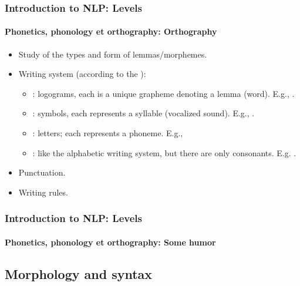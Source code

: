 \documentclass[xcolor=table]{beamer}
\begin{document}
\begin{frame}
\frametitle{Introduction to NLP: Levels}
\framesubtitle{Phonetics, phonology et orthography: Orthography}

\begin{itemize}
	\item Study of the types and form of lemmas/morphemes.
	\item Writing system (according to the ): 
	\begin{itemize}
		\item {}: logograms, each is a unique grapheme denoting a lemma (word).
		E.g., .
		\item {}: symbols, each represents a syllable (vocalized sound).
		E.g., .
		\item {}: letters; each represents a phoneme.
		E.g., 
		\item {}: like the alphabetic writing system, but there are only consonants. 
		E.g. .
	\end{itemize}
	\item Punctuation.
	\item Writing rules.
\end{itemize}

\end{frame}

\begin{frame}
\frametitle{Introduction to NLP: Levels}
\framesubtitle{Phonetics, phonology et orthography: Some humor}

\begin{center}
\end{center}

\end{frame}

\subsection{Morphology and syntax}
\end{document}
